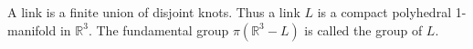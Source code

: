 A link is a finite union of disjoint knots. Thus a link $L$ is a compact polyhedral 1-manifold in $\mathbb{R}^3$. The fundamental group $\pi(\mathbb{R}^3 - L)$ is called the group of $L$.
